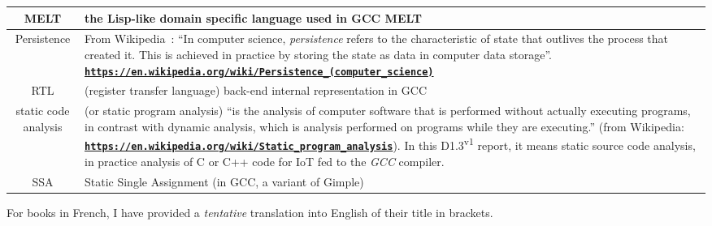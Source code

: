 \documentclass[11pt,a4paper,svgnames]{article}
\newcommand{\bmurl}[1]{{\href{#1}{\texttt{\textbf{#1}}}}}
\begin{document}
\begin{tabular}{|c|p{}|}
  \hline MELT & the Lisp-like domain specific language used in GCC MELT \\
  \hline Persistence & From Wikipedia~: ``In computer science, \emph{persistence} refers to the characteristic of state that outlives the process that created it. This is achieved in practice by storing the state as data in computer data storage''. \bmurl{https://en.wikipedia.org/wiki/Persistence\_(computer\_science)} \\
  \hline RTL & (register transfer language) back-end internal representation in GCC \\
  \hline static code analysis & (or static program analysis) ``is the analysis of computer software that is performed without actually executing programs, in contrast with dynamic analysis, which is analysis performed on programs while they are executing.'' (from Wikipedia: \bmurl{https://en.wikipedia.org/wiki/Static\_program\_analysis}). In this D1.3\textsuperscript{v1} report, it means static source code analysis, in practice analysis of C or C++ code for IoT fed to the \emph{GCC} compiler. \\
  \hline SSA & Static Single Assignment (in GCC, a variant of Gimple) \\
  \hline
\end{tabular}

\newpage


\newpage



\newpage



\newpage


\newpage


\newpage




\begin{flushright}
  \begin{relsize}{-2}
    For books in French, I have provided a \emph{tentative} translation into
    English of their title in brackets.
  \end{relsize}
\end{flushright}

\clearpage

\printindex

\medskip
\end{document}
